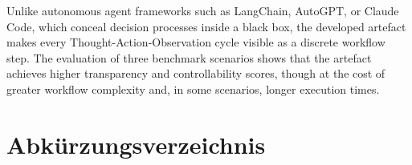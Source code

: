 \documentclass[12pt,a4paper,oneside]{report}
\begin{document}
Unlike autonomous agent frameworks such as LangChain, AutoGPT, or Claude Code, which
conceal decision processes inside a black box, the developed artefact makes every
Thought-Action-Observation cycle visible as a discrete workflow step. The evaluation of
three benchmark scenarios shows that the artefact achieves higher transparency and
controllability scores, though at the cost of greater workflow complexity and, in some
scenarios, longer execution times.

\newpage

\tableofcontents
\newpage

\listoffigures
{}
\newpage

\listoftables
{}
\newpage

\chapter*{Abkürzungsverzeichnis}

\begin{acronym}[HITL]
\end{acronym}

\newpage

\end{document}
